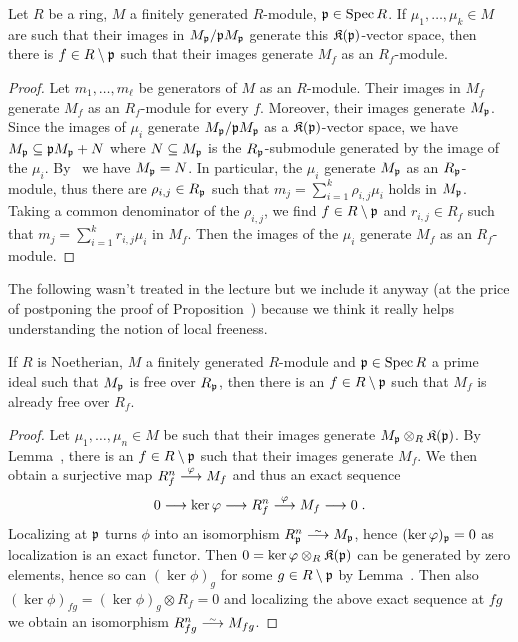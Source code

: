 \documentclass[a4paper,parskip=half,numbers=enddot, DIV=12]{scrreprt}
\begin{document}
\begin{lem}
    Let $R$ be a ring, $M$ a finitely generated $R$-module, $\mathfrak{p}\in \operatorname{Spec} R$. If $\mu_1,\ldots,\mu_k\in M$ are such that their images in $M_{\mathfrak{p}}/\mathfrak{p} M_{\mathfrak{p}}$ generate this $\mathfrak{K}(\mathfrak{p})$-vector space, then there is $f\in R\setminus \mathfrak{p}$ such that their images generate $M_f$ as an $R_f$-module.
\end{lem}
\begin{proof}
    Let $m_1,\ldots, m_\ell$ be generators of $M$ as an $R$-module. Their images in $M_f$ generate $M_f$ as an $R_f$-module for every $f$. Moreover, their images generate $M_{\mathfrak{p}}$. Since the images of $\mu_i$ generate $M_{\mathfrak{p}}/\mathfrak{p} M_{\mathfrak{p}}$ as a $\mathfrak{K}(\mathfrak{p})$-vector space, we have $M_{\mathfrak{p}} \subseteq \mathfrak{p} M_{\mathfrak{p}} +N$ where $N\subseteq M_{\mathfrak{p}}$ is the $R_{\mathfrak{p}}$-submodule generated by the image of the $\mu_i$. By \NAK\ we have $M_{\mathfrak{p}}=N$. In particular, the $\mu_i$ generate $M_{\mathfrak{p}}$ as an $R_{\mathfrak{p}}$-module, thus there are $\rho_{i,j}\in R_{\mathfrak{p}}$ such that $m_j = \sum_{i=1}^k \rho_{i,j} \mu_i$ holds in $M_{\mathfrak{p}}$. Taking a common denominator of the $\rho_{i,j}$, we find $f\in R\setminus \mathfrak{p}$ and $r_{i,j}\in R_f$ such that $m_j = \sum_{i=1}^k r_{i,j}\mu_i$ in $M_f$. Then the images of the $\mu_i$ generate $M_f$ as an $R_f$-module.
\end{proof}
The following wasn't treated in the lecture but we include it anyway (at the price of postponing the proof of Proposition~) because we think it really helps understanding the notion of local freeness.
\begin{cor}
	If $R$ is Noetherian, $M$ a finitely generated $R$-module and $\mathfrak{p}\in\operatorname{Spec} R$ a prime ideal such that $M_{\mathfrak{p}}$ is free over $R_{\mathfrak{p}}$, then there is an $f\in R\setminus \mathfrak{p}$ such that $M_f$ is already free over $R_f$.
\end{cor}
\begin{proof}
	Let $\mu_1,\ldots,\mu_n\in M$ be such that their images generate $M_{\mathfrak{p}}\otimes_R\mathfrak{K}(\mathfrak{p})$. By Lemma~, there is an $f\in R\setminus \mathfrak{p}$ such that their images generate $M_f$. We then obtain a surjective map $R_f^n\morphism[\phi]M_f$ and thus an exact sequence
	\begin{align*}
		0\morphism\ker\phi\morphism R_f^n\morphism[\phi]M_f\morphism 0\;.
	\end{align*}
	Localizing at $\mathfrak{p}$ turns $\phi$ into an isomorphism $R_\pp^n\isomorphism M_\pp$, hence $(\ker\varphi)_{\mathfrak{p}}=0$ as localization is an exact functor. Then $0=\ker\varphi\otimes_R\mathfrak{K}(\mathfrak{p})$ can be generated by zero elements, hence so can $(\ker\phi)_g$ for some $g\in R\setminus \mathfrak{p}$ by Lemma~. Then also $(\ker\phi)_{fg}=(\ker\phi)_g\otimes R_f=0$ and localizing the above exact sequence at $fg$ we obtain an isomorphism $R_{fg}^n\isomorphism M_{fg}$.
\end{proof}
\end{document}
